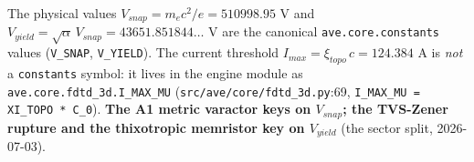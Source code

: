 \noindent The physical values $V_{snap} = m_e c^2/e = 510998.95$ V and
$V_{yield} = \sqrt{\alpha}\,V_{snap} = 43651.851844\ldots$ V are the canonical
\texttt{ave.core.constants} values (\texttt{V\_SNAP}, \texttt{V\_YIELD}).
The current threshold $I_{max} = \xi_{topo}\,c = 124.384$ A is \emph{not} a
\texttt{constants} symbol: it lives in the engine module as
\texttt{ave.core.fdtd\_3d.I\_MAX\_MU}
(\texttt{src/ave/core/fdtd\_3d.py}:69, \texttt{I\_MAX\_MU = XI\_TOPO * C\_0}).
\textbf{The A1 metric varactor keys on
$V_{snap}$; the TVS-Zener rupture and the thixotropic memristor key on
$V_{yield}$} (the sector split, 2026-07-03).

